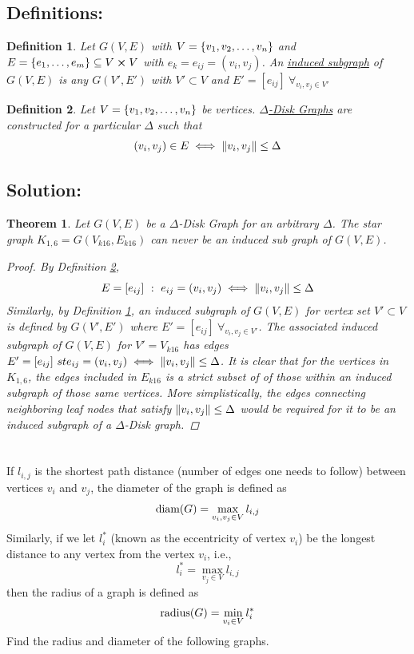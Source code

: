 \documentclass[]{article}
\numberwithin{equation}{section}
\newcommand{\st}{\ : \ }
\newtheorem{definition}{Definition}
\newtheorem{theorem}{Theorem}
\newcommand{\diam}{\textnormal{diam}}
\newcommand{\radius}{\textnormal{radius}}
\begin{document}
\subsection{Definitions:}
\begin{definition}\label{def:induced_subgraph}
	Let $G(V,E)$ with $V = \qty{v_1,v_2,\dots,v_n}$ 
	and $E = \qty{e_1, \dots, e_m} \subseteq V \cross V$ 
	with $e_k = e_{ij} = (v_i, v_j)$.
	An \emph{\underline{induced subgraph}} of $G(V,E)$ is any $G(V',E')$ with $V'\subset V$ and $E' = [e_{ij}] \ \forall_{v_i, v_j \in V'}$
\end{definition}

\begin{definition}\label{def:Delta-disk_graph}
	Let $V = \qty{v_1,v_2,\dots,v_n}$ be vertices.
	\emph{\underline{$\Delta$-Disk Graphs}} are constructed for a particular $\Delta$ such that \[
		(v_i,v_j) \in E \iff \norm{v_i,v_j} \leq \Delta
	\]
\end{definition}

\subsection{Solution:}
\begin{theorem}
	Let $G(V,E)$ be a $\Delta$-Disk Graph for an arbitrary $\Delta$.
	The star graph $K_{1,6} = G(V_{k16},E_{k16})$ can never be an induced sub graph of $G(V,E)$.
	\begin{proof}
		By Definition \ref{def:Delta-disk_graph}, \[
			E = [e_{ij}] \st e_{ij} = (v_i,v_j) \iff \norm{v_i,v_j} \leq \Delta
		\] Similarly, by Definition \ref{def:induced_subgraph}, an induced subgraph of $G(V,E)$ for vertex set $V' \subset V$ is defined by $G(V',E')$ where $E' = [e_{ij}] \ \forall_{v_i, v_j \in V'}$.
		The associated induced subgraph of $G(V,E)$ for $V' = V_{k16}$ has edges $E' = [e_{ij}] \ st e_{ij} = (v_i,v_j) \iff \norm{v_i,v_j} \leq \Delta$.
		It is clear that for the vertices in $K_{1,6}$, the edges included in $E_{k16}$ is a strict subset of of those within an induced subgraph of those same vertices.
		More simplistically, the edges connecting neighboring leaf nodes that satisfy $\norm{v_i,v_j} \leq \Delta$ would be required for it to be an induced subgraph of a $\Delta$-Disk graph.
	\end{proof}
\end{theorem}

\newpage
\section{}
If $l_{i,j}$ is the shortest path distance (number of edges one needs to follow) between vertices $v_i$ and $v_j$, 
the diameter of the graph is defined as\[
	\diam(G) = \max_{v_i,v_j \in V} l_{i,j}
\] Similarly, if we let $l_{i}^{*}$ (known as the eccentricity of vertex $v_i$) be the longest distance to any vertex from the vertex $v_i$, i.e.,\[
	l_{i}^{*} = \max_{v_j \in V} l_{i,j}
\] then the radius of a graph is defined as\[
	\radius(G) = \min_{v_i \in V} l_{i}^{*}
\] Find the radius and diameter of the following graphs.
\end{document}
